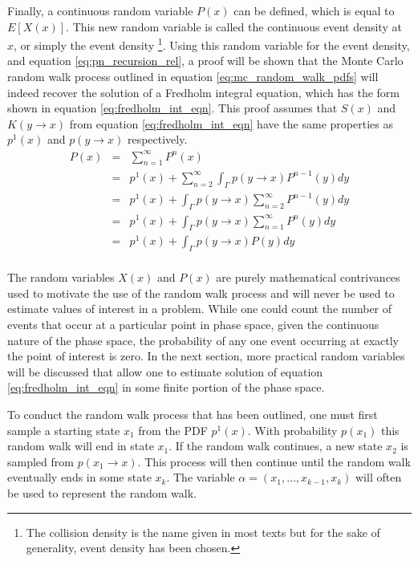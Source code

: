 Finally, a continuous random variable $P(x)$ can be defined, which is equal to
$E[X(x)]$. This new random variable is called the continuous event density 
at $x$, or simply the event density
\footnote{The collision density is the name given in most texts but for the
sake of generality, event density has been chosen.}. Using this random variable 
for the event density, and equation \ref{eq:pn_recursion_rel}, a proof will be 
shown that the Monte Carlo random walk process outlined in equation 
\ref{eq:mc_random_walk_pdfs} will indeed recover the solution of a Fredholm 
integral equation, which has the form shown in equation 
\ref{eq:fredholm_int_eqn}. This proof assumes that $S(x)$ and $K(y \to x)$ from 
equation \ref{eq:fredholm_int_eqn} have the same properties as $p^1(x)$ and 
$p(y \to x)$ respectively. 
\begin{eqnarray}
  P(x) & = & \sum_{n=1}^{\infty} P^n(x) \nonumber \\
  & = & p^1(x) + \sum_{n=2}^{\infty} \int_{\Gamma} p(y \to x) P^{n-1}(y)dy \nonumber\\
  & = & p^1(x) + \int_{\Gamma} p(y \to x) \sum_{n=2}^{\infty} P^{n-1}(y)dy \nonumber\\
  & = & p^1(x) + \int_{\Gamma} p(y \to x) \sum_{n=1}^{\infty} P^{n}(y)dy \nonumber\\
  & = & p^1(x) + \int_{\Gamma} p(y \to x) P(y)dy \nonumber \\
\end{eqnarray}

The random variables $X(x)$ and $P(x)$ are purely mathematical contrivances
used to motivate the use of the random walk process and will never be used 
to estimate values of interest in a problem. While one could count the
number of events that occur at a particular point in phase space, given the 
continuous nature of the phase space, the probability of any one event 
occurring at exactly the point of interest is zero. In the next section, more 
practical random variables will be discussed that allow one to estimate 
solution of equation \ref{eq:fredholm_int_eqn} in some finite portion of the 
phase space.

To conduct the random walk process that has been outlined, one must first 
sample a starting state $x_1$ from the PDF $p^1(x)$. With probability $p(x_1)$ 
this random walk will end in state $x_1$. If the random walk continues, a new 
state $x_2$ is sampled from $p(x_1 \to x)$. This process will then continue 
until the random walk eventually ends in some state $x_k$. The variable 
$\alpha = (x_1,\ldots,x_{k-1},x_k)$ will often be used to represent the random 
walk. 

